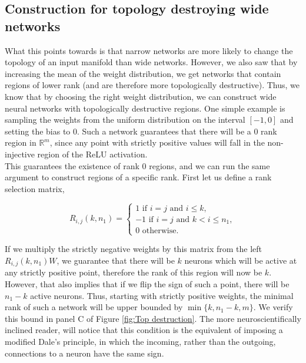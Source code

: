 \subsection{Construction for topology destroying wide networks}
What this points towards is that narrow networks are more likely to change the topology of an input manifold than wide networks. However, we also saw that by increasing the mean of the weight distribution, we get networks that contain regions of lower rank (and are therefore more topologically destructive). Thus, we know that by choosing the right weight distribution, we can construct wide neural networks with topologically destructive regions. One simple example is sampling the weights from the uniform distribution on the interval $[-1,0]$ and setting the bias to 0. Such a network guarantees that there will be a 0 rank region in $\mathbb{R}^m$, since any point with strictly positive values will fall in the non-injective region of the ReLU activation.\\


This guarantees the existence of rank 0 regions, and we can run the same argument to construct regions of a specific rank. First let us define a rank selection matrix,

\begin{equation}
    R_{i,j}(k,n_1) = 
    \begin{cases}
        1 \text{ if } i=j \text{ and } i\leq k,\\
        -1 \text{ if } i=j \text{ and } k < i \leq n_1, \\
        0 \text{ otherwise}.
    \end{cases}
\end{equation}

If we multiply the strictly negative weights by this matrix from the left $R_{i,j}(k,n_1)W$, we guarantee that there will be $k$ neurons which will be active at any strictly positive point, therefore the rank of this region will now be $k$. However, that also implies that if we flip the sign of such a point, there will be $n_1-k$ active neurons. Thus, starting with strictly positive weights, the minimal rank of such a network will be upper bounded by $\min\{k,n_1-k,m\}$. We verify this bound in panel C of Figure \ref{fig:Top destruction}. The more neuroscientifically inclined reader, will notice that this condition is the equivalent of imposing a modified Dale's principle, in which the incoming, rather than the outgoing, connections to a neuron have the same sign.

